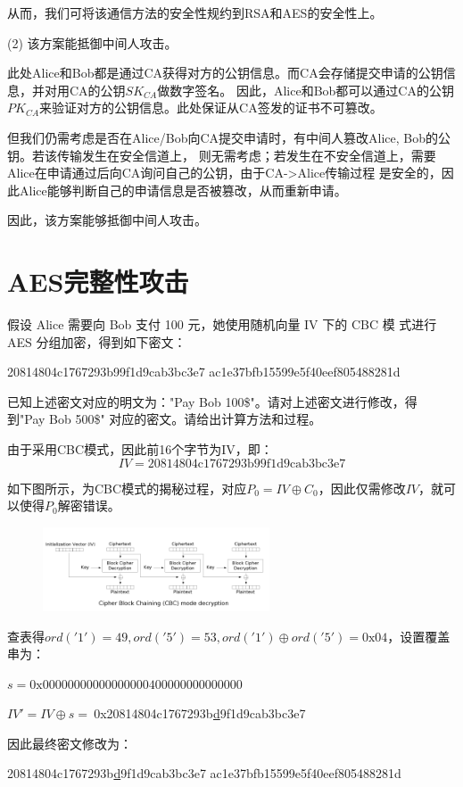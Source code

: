 \begin{Solution}
    从而，我们可将该通信方法的安全性规约到RSA和AES的安全性上。

    \newpage
    (2) 该方案能抵御中间人攻击。

    此处Alice和Bob都是通过CA获得对方的公钥信息。而CA会存储提交申请的公钥信息，并对用CA的公钥$SK_{CA}$做数字签名。
    因此，Alice和Bob都可以通过CA的公钥$PK_{CA}$来验证对方的公钥信息。此处保证从CA签发的证书不可篡改。

    但我们仍需考虑是否在Alice/Bob向CA提交申请时，有中间人篡改Alice, Bob的公钥。若该传输发生在安全信道上，
    则无需考虑；若发生在不安全信道上，需要Alice在申请通过后向CA询问自己的公钥，由于CA->Alice传输过程
    是安全的，因此Alice能够判断自己的申请信息是否被篡改，从而重新申请。

    因此，该方案能够抵御中间人攻击。
    
\end{Solution}

\section{AES完整性攻击}

假设 Alice 需要向 Bob 支付 100 元，她使用随机向量 IV 下的 CBC 模
式进行 AES 分组加密，得到如下密文：

\begin{center}
    20814804c1767293b99f1d9cab3bc3e7 ac1e37bfb15599e5f40eef805488281d
\end{center}
已知上述密文对应的明文为："Pay Bob 100\$"。请对上述密文进行修改，得
到"Pay Bob 500\$" 对应的密文。请给出计算方法和过程。

\begin{Solution}
    由于采用CBC模式，因此前16个字节为IV，即：
    \begin{equation}
        IV = \text{20814804c1767293b99f1d9cab3bc3e7}
    \end{equation}

        如下图所示，为CBC模式的揭秘过程，对应$P_0=IV\oplus C_0$，因此仅需修改$IV$，就可以使得$P_0$解密错误。
    \begin{figure}[!htbp]
        \centering
        \includegraphics[width=0.6\textwidth]{figures/cbc_decryption.png}
    \end{figure}
    
    查表得$ord('1') = 49, ord('5') = 53, ord('1') \oplus ord('5') = 0\text{x}04$，设置覆盖串为：

    $s = \text{0x00000000000000000400000000000000}$

    $IV' = IV \oplus s =~$0x20814804c1767293b\underline{d}9f1d9cab3bc3e7

    因此最终密文修改为：
    \begin{center}
        20814804c1767293b\underline{d}9f1d9cab3bc3e7 ac1e37bfb15599e5f40eef805488281d
    \end{center}
\end{Solution}

